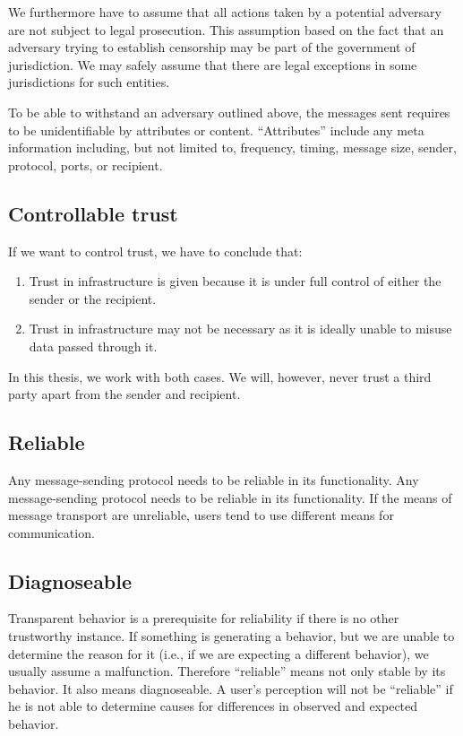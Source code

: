 We furthermore have to assume that all actions taken by a potential adversary are not subject to legal prosecution. This assumption based on the fact that an adversary trying to establish censorship may be part of the government of jurisdiction. We may safely assume that there are legal exceptions in some jurisdictions for such entities.

To be able to withstand an adversary outlined above, the messages sent requires to be unidentifiable by attributes or content. ``Attributes'' include any meta information including, but not limited to, frequency, timing, message size, sender, protocol, ports, or recipient.

\subsection{Controllable trust}
If we want to control trust, we have to conclude that:
\begin{enumerate}
	\item Trust in infrastructure is given because it is under full control of either the sender or the recipient.
	\item Trust in infrastructure may not be necessary as it is ideally unable to misuse data passed through it.
\end{enumerate}

In this thesis, we work with both cases. We will, however, never trust a third party apart from the sender and recipient.

\subsection{Reliable}
Any message-sending protocol needs to be reliable in its functionality. Any message-sending protocol needs to be reliable in its functionality. If the means of message transport are unreliable, users tend to use different means for communication. 

\subsection{Diagnoseable}
Transparent behavior is a prerequisite for reliability if there is no other trustworthy instance. If something is generating a  behavior, but we are unable to determine the reason for it (i.e., if we are expecting a different behavior), we usually assume a malfunction. Therefore ``reliable'' means not only stable by its behavior. It also means diagnoseable. A user's perception will not be ``reliable'' if he is not able to determine causes for differences in observed and expected behavior.

